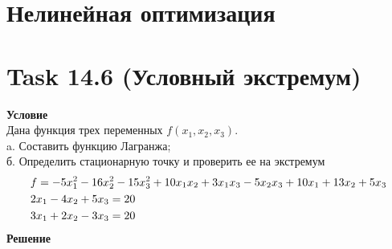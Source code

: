 \documentclass[12pt]{article}
\begin{document}
\section*{Нелинейная оптимизация}

\section*{Task 14.6 (Условный экстремум)}
\textbf{Условие}\\
Дана функция трех переменных $f(x_1, x_2, x_3)$.\\
a. Составить функцию Лагранжа;\\
б. Определить стационарную точку и проверить ее на экстремум
\begin{align}
  &f = -5x_1^2-16x_2^2-15x_3^2+10x_1x_2+3x_1x_3-5x_2x_3+10x_1+13x_2+5x_3\notag\\
  &2x_1-4x_2+5x_3=20\\
  &3x_1+2x_2-3x_3=20\notag
\end{align}
\textbf{Решение}
\end{document}
